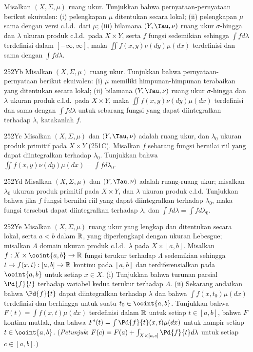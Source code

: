 {
Misalkan $(X,\Sigma,\mu)$ ruang ukur. Tunjukkan bahwa
pernyataan-pernyataan berikut ekuivalen: (i) pelengkapan $\mu$ ditentukan
secara lokal; (ii) pelengkapan $\mu$ sama dengan versi c.l.d.\ dari
$\mu$; (iii) bilamana $(Y,\Tau,\nu)$ ruang ukur $\sigma$-hingga dan
$\lambda$ ukuran produk c.l.d.\ pada $X\times Y$, serta $f$ fungsi
sedemikian sehingga $\int fd\lambda$ terdefinisi dalam
$[-\infty,\infty]$, maka $\iint f(x,y)\nu(dy)\mu(dx)$ terdefinisi dan
sama dengan $\int fd\lambda$.

\spheader 252Yb Misalkan $(X,\Sigma,\mu)$ ruang ukur. Tunjukkan bahwa
pernyataan-pernyataan berikut ekuivalen: (i) $\mu$ memiliki himpunan-himpunan
terabaikan yang ditentukan secara lokal; (ii) bilamana $(Y,\Tau,\nu)$ ruang
ukur $\sigma$-hingga dan $\lambda$ ukuran produk c.l.d.\ pada
$X\times Y$, maka $\iint f(x,y)\nu(dy)\mu(dx)$ terdefinisi dan sama dengan
$\int fd\lambda$ untuk sebarang fungsi yang dapat diintegralkan terhadap
$\lambda$, katakanlah $f$.

\spheader 252Yc Misalkan $(X,\Sigma,\mu)$ dan $(Y,\Tau,\nu)$ adalah ruang
ukur, dan $\lambda_0$ ukuran produk primitif pada $X\times Y$ (251C).
Misalkan $f$ sebarang fungsi bernilai riil yang dapat diintegralkan terhadap
$\lambda_0$. Tunjukkan bahwa
$\iint f(x,y)\nu(dy)\mu(dx)=\int fd\lambda_0$. 

\spheader 252Yd Misalkan $(X,\Sigma,\mu)$ dan
$(Y,\Tau,\nu)$ adalah
ruang-ruang ukur; misalkan $\lambda_0$ ukuran produk primitif pada
$X\times Y$, dan $\lambda$ ukuran produk c.l.d. Tunjukkan bahwa jika
$f$ fungsi bernilai riil yang dapat diintegralkan terhadap $\lambda_0$, maka
fungsi tersebut dapat diintegralkan terhadap $\lambda$, dan
$\int fd\lambda=\int fd\lambda_0$.

\spheader 252Ye
Misalkan $(X,\Sigma,\mu)$ ruang ukur yang lengkap dan ditentukan secara lokal,
serta $a<b$ dalam
$\Bbb R$, yang diperlengkapi dengan ukuran Lebesgue; misalkan $\Lambda$ domain
ukuran produk c.l.d.\ $\lambda$ pada $X\times[a,b]$. Misalkan
$f:X\times\ooint{a,b}\to\Bbb R$ fungsi terukur terhadap $\Lambda$ sedemikian
sehingga $t\mapsto f(x,t):[a,b]\to\Bbb R$ kontinu pada $[a,b]$ dan
terdiferensialkan pada $\ooint{a,b}$ untuk setiap $x\in X$. (i) Tunjukkan
bahwa turunan parsial $\Pd{f}{t}$ terhadap variabel kedua terukur terhadap
$\Lambda$. (ii) Sekarang andaikan bahwa $\Pd{f}{t}$ dapat diintegralkan
terhadap $\lambda$ dan bahwa $\int f(x,t_0)\mu(dx)$ terdefinisi dan berhingga
untuk suatu $t_0\in\ooint{a,b}$. Tunjukkan bahwa
$F(t)=\int f(x,t)\mu(dx)$ terdefinisi dalam $\Bbb R$ untuk setiap $t\in[a,b]$,
bahwa $F$ kontinu mutlak, dan bahwa
$F'(t)=\int\Pd{f}{t}(x,t)\mu(dx)$
untuk hampir setiap $t\in\ooint{a,b}$. ({\it Petunjuk\/}:
$F(c)=F(a)+\int_{X\times[a,c]}\Pd{f}{t}d\lambda$ untuk setiap $c\in[a,b]$.)

}
